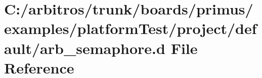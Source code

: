 \hypertarget{boards_2primus_2examples_2platform_test_2project_2default_2arb__semaphore_8d}{\section{C\-:/arbitros/trunk/boards/primus/examples/platform\-Test/project/default/arb\-\_\-semaphore.d File Reference}
\label{boards_2primus_2examples_2platform_test_2project_2default_2arb__semaphore_8d}
}

